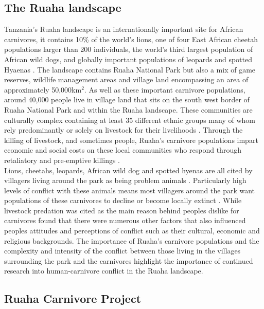 \subsection{The Ruaha landscape}
 
Tanzania's Ruaha landscape is an internationally important site for African carnivores, it contains 10\% of the world's lions, one of four East African cheetah populations larger than 200 individuals, the world's third largest population of African wild dogs, and globally important populations of leopards and spotted Hyaenas \citep{Dickman2014d}. The landscape contains Ruaha National Park but also a mix of game reserves, wildlife management areas and village land encompassing an area of approximately 50,000km$^2$. As well as these important carnivore populations, around 40,000 people live in village land that sits on the south west border of Ruaha National Park and within the Ruaha landscape. These communities are culturally complex containing at least 35 different ethnic groups many of whom rely predominantly or solely on livestock for their livelihoods  \citep{Abade2014h}. Through the killing of livestock, and sometimes people, Ruaha's carnivore populations impart economic and social costs on these local communities who respond through retaliatory and pre-emptive killings \citep{Dickman2010b}.\\

Lions, cheetahs, leopards, African wild dog and spotted hyenas are all cited by villagers living around the park as being problem animals \citep{Dickman2008}. Particularly high levels of conflict with these animals means most villagers around the park want populations of these carnivores to decline or become locally extinct \citep{Dickman2008}. While livestock predation was cited as the main reason behind peoples dislike for carnivores \citet{Dickman2008} found that there were numerous other factors that also influenced peoples attitudes and perceptions of conflict such as their cultural, economic and religious backgrounds. The importance of Ruaha's carnivore populations and the complexity and intensity of the conflict between those living in the villages surrounding the park and the carnivores highlight the importance of continued research into human-carnivore conflict in the Ruaha landscape.\\

\subsection{Ruaha Carnivore Project}

